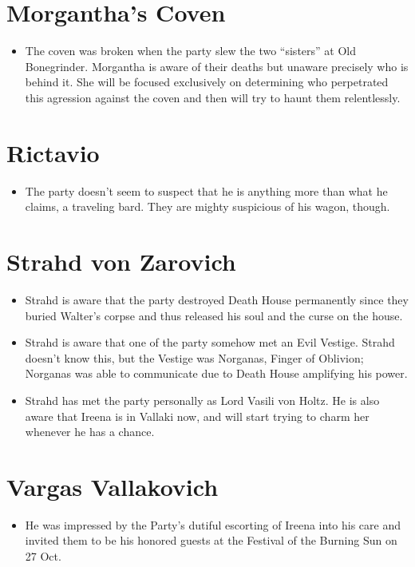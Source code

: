\documentclass[a4paper,11pt]{article}
\begin{document}
\section{Morgantha's Coven}
\begin{itemize}
  \item The coven was broken when the party slew the two ``sisters'' at Old Bonegrinder. Morgantha is aware of 
  their deaths but unaware precisely who is behind it. She will be focused exclusively on determining who 
  perpetrated this agression against the coven and then will try to haunt them relentlessly.
\end{itemize}

\section{Rictavio}
\begin{itemize}
  \item The party doesn't seem to suspect that he is anything more than what he claims, a traveling bard. They 
  are mighty suspicious of his wagon, though.
\end{itemize}

\section{Strahd von Zarovich}
\begin{itemize}
  \item Strahd is aware that the party destroyed Death House permanently since they buried Walter's corpse and 
  thus released his soul and the curse on the house.
  \item Strahd is aware that one of the party somehow met an Evil Vestige. Strahd doesn't know this, but the 
  Vestige was Norganas, Finger of Oblivion; Norganas was able to communicate due to Death House amplifying his 
  power.
  \item Strahd has met the party personally as Lord Vasili von Holtz. He is also aware that Ireena is in Vallaki 
  now, and will start trying to charm her whenever he has a chance.
\end{itemize}

\section{Vargas Vallakovich}
\begin{itemize}
  \item He was impressed by the Party's dutiful escorting of Ireena into his care and invited them to be his
  honored guests at the Festival of the Burning Sun on 27 Oct.
\end{itemize}
\end{document}
